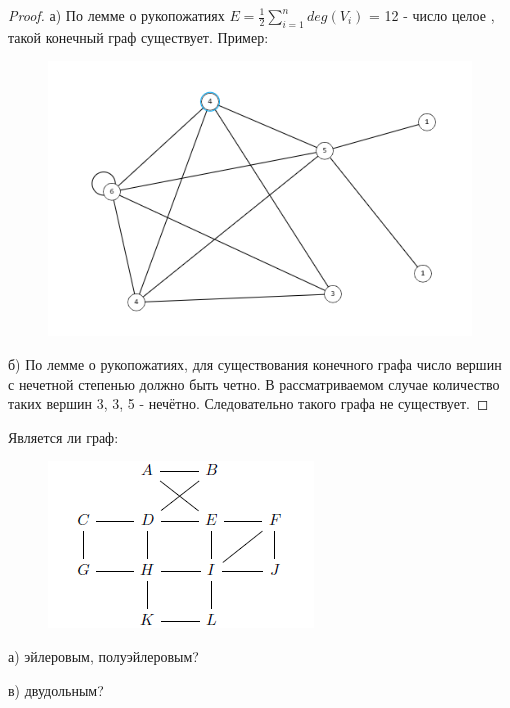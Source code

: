 \begin{proof}
    а) По лемме о рукопожатиях $E = \frac{1}{2}\sum\limits_{i=1}^{n}deg(V_{i})$ = 12 - число целое , такой конечный граф существует. Пример:

    \begin{figure}[h]
    \centering
     \includegraphics[width=0.6\linewidth]{pics/3_a_solution.png}
     \label{fig:dm}
    \end{figure}

    б) По лемме о рукопожатиях, для существования конечного графа число вершин с нечетной степенью должно быть четно. В рассматриваемом случае количество таких вершин 3, 3, 5 - нечётно. Следовательно такого графа не существует.
\end{proof}

\begin{problem}[5]
	Является ли граф: 
    \begin{figure}[h]
    \centering
     \includegraphics[width=0.4\linewidth]{pics/Graph5th.png}
     \label{fig:dm}
    \end{figure}
    
    а) эйлеровым, полуэйлеровым?
    
    в) двудольным?
\end{problem}


